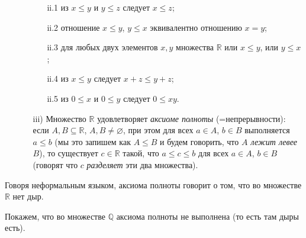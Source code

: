 \begin{definition}
\begin{enumerate}
\begin{itemize}
          \begin{itemize}
              \item [ii.1] из $x\le y$ и $y\le z$ следует $x\le z$;
              \item [ii.2] отношение $x\le y$, $y\le x$ эквивалентно отношению $x = y$;
              \item[ii.3] для любых двух элементов $x,y$ множества $\mathbb{R}$ или $x\le y$, или $y \le x$;
              \item[ii.4] из $x \le y$ следует $x+z \le y+z$;
              \item[ii.5] из $0 \le x$ и $0 \le y$ следует $0 \le xy$.
          \end{itemize}
          \item[iii)] Множество $\mathbb{R}$ удовлетворяет \textit{аксиоме полноты} (=непрерывности):
          если $A,B\subseteq \mathbb{R}$, $A,B \ne \varnothing$, при этом для всех $a\in A$, $b\in B$ выполняется $a \le b$ (мы это запишем как $A\le B$ и будем говорить, что \textit{$A$ лежит левее $B$}), то существует $c \in \mathbb{R}$ такой, что $a\le c \le b$ для всех $a\in A$, $b\in B$ (говорят что $c$ \textit{разделяет} эти два множества).
     \end{itemize}
\end{enumerate}

\end{definition}


Говоря неформальным языком, аксиома полноты говорит о том, что во множестве $\mathbb{R}$ нет дыр.

Покажем, что во множестве $\mathbb{Q}$ аксиома полноты не выполнена (то есть там дыры есть).

